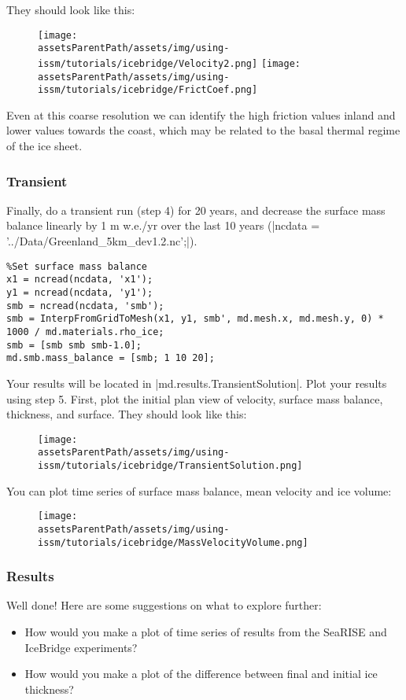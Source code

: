 They should look like this:
\begin{figure}[H]
	\begin{center}
		\texttt{[image: \\assetsParentPath/assets/img/using-issm/tutorials/icebridge/Velocity2.png]}
		\texttt{[image: \\assetsParentPath/assets/img/using-issm/tutorials/icebridge/FrictCoef.png]}
	\end{center}
\end{figure}
Even at this coarse resolution we can identify the high friction values inland and lower values towards the coast, which may be related to the basal thermal regime of the ice sheet.

\subsubsection{Transient} %
Finally, do a transient run (step 4) for 20 years, and decrease the surface mass balance linearly by 1 m w.e./yr over the last 10 years (\lstinlinebg|ncdata = '../Data/Greenland_5km_dev1.2.nc';|).
\begin{lstlisting}
%Set surface mass balance
x1 = ncread(ncdata, 'x1');
y1 = ncread(ncdata, 'y1');
smb = ncread(ncdata, 'smb');
smb = InterpFromGridToMesh(x1, y1, smb', md.mesh.x, md.mesh.y, 0) * 1000 / md.materials.rho_ice;
smb = [smb smb smb-1.0];
md.smb.mass_balance = [smb; 1 10 20];
\end{lstlisting}

Your results will be located in \lstinlinebg|md.results.TransientSolution|. Plot your results using step 5. First, plot the initial plan view of velocity, surface mass balance, thickness, and surface. They should look like this:
\begin{figure}[H]
	\begin{center}
		\texttt{[image: \\assetsParentPath/assets/img/using-issm/tutorials/icebridge/TransientSolution.png]}
	\end{center}
\end{figure}
You can plot time series of surface mass balance, mean velocity and ice volume:
\begin{figure}[H]
	\begin{center}
		\texttt{[image: \\assetsParentPath/assets/img/using-issm/tutorials/icebridge/MassVelocityVolume.png]}
	\end{center}
\end{figure}

\subsubsection{Results} %
Well done! Here are some suggestions on what to explore further:
\begin{itemize}
	\item How would you make a plot of time series of results from the SeaRISE and IceBridge experiments?
	\item How would you make a plot of the difference between final and initial ice thickness?
\end{itemize}

\clearpage %
